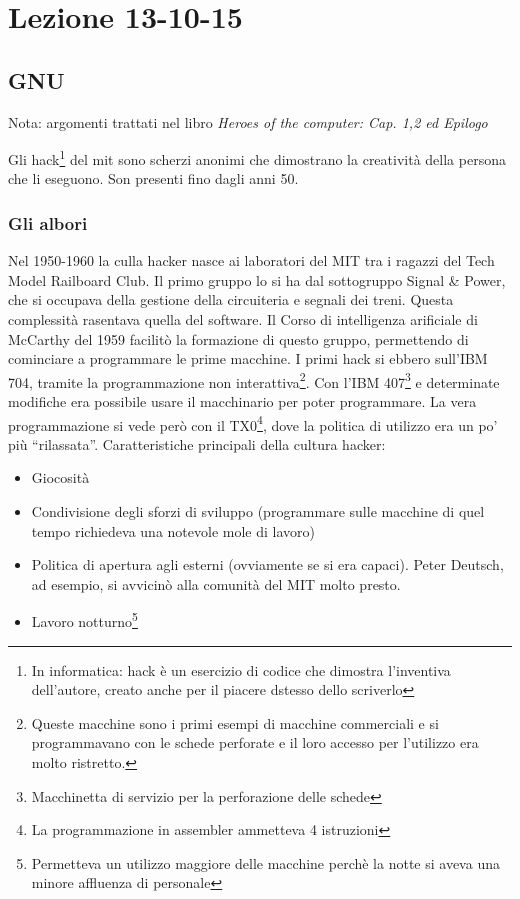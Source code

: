 \section{Lezione 13-10-15}

\subsection{GNU}

Nota: argomenti trattati nel libro \textit{Heroes of the computer: Cap. 1,2 ed Epilogo}

Gli hack\footnote{In informatica: hack \`e un esercizio di codice che dimostra l'inventiva dell'autore, creato anche per il piacere dstesso dello scriverlo} del mit sono scherzi anonimi che dimostrano la creativit\`a della persona che li eseguono. Son presenti fino dagli anni 50.

\subsubsection{Gli albori}

Nel 1950-1960 la culla hacker nasce ai laboratori del MIT tra i ragazzi del Tech Model Railboard Club. Il primo gruppo lo si ha dal sottogruppo Signal \& Power, che si occupava della gestione della circuiteria e segnali dei treni. Questa complessit\`a rasentava quella del software. Il Corso di intelligenza arificiale di McCarthy del 1959 facilit\`o la formazione di questo gruppo, permettendo di cominciare a programmare le prime macchine. I primi hack si ebbero sull'IBM 704, tramite la programmazione non interattiva\footnote{Queste macchine sono i primi esempi di macchine commerciali e si programmavano con le schede perforate e il loro accesso per l'utilizzo era molto ristretto.}. Con l'IBM 407\footnote{Macchinetta di servizio per la perforazione delle schede} e determinate modifiche era possibile usare il macchinario per poter programmare. La vera programmazione si vede per\`o con il TX0\footnote{La programmazione in assembler ammetteva 4 istruzioni}, dove la politica di utilizzo era un po' pi\`u ``rilassata''.
Caratteristiche principali della cultura hacker:
\begin{itemize}

\item Giocosit\`a
\item Condivisione degli sforzi di sviluppo (programmare sulle macchine di quel tempo richiedeva una notevole mole di lavoro)
\item Politica di apertura agli esterni (ovviamente se si era capaci). Peter Deutsch, ad esempio, si avvicin\`o alla comunit\`a del MIT molto presto.
\item Lavoro notturno\footnote{Permetteva un utilizzo maggiore delle macchine perch\`e la notte si aveva una minore affluenza di personale}

\end{itemize}

